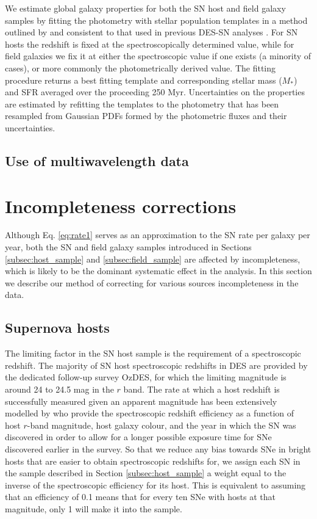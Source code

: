 \documentclass[fleqn,usenatbib]{mnras}
\begin{document}
We estimate global galaxy properties for both the SN host and field galaxy samples by fitting the photometry with stellar population templates in a method outlined by \citet{Sullivan2006} and consistent to that used in previous DES-SN analyses \citep{Kelsey2020,Smith2020,Wiseman2020}. For SN hosts the redshift is fixed at the spectroscopically determined value, while for field galaxies we fix it at either the spectroscopic value if one exists (a minority of cases), or more commonly the photometrically derived value. The fitting procedure returns a best fitting template and corresponding stellar mass ($M_*$) and SFR averaged over the proceeding 250 Myr. Uncertainties on the properties are estimated by refitting the templates to the photometry that has been resampled from Gaussian PDFs formed by the photometric fluxes and their uncertainties. 


\subsection{Use of multiwavelength data \label{subsec: fits_ugrizJHK}}

\section{Incompleteness corrections \label{sec:incompleteness}}

Although Eq. \ref{eq:rate1} serves as an approximation to the SN rate per galaxy per year, both the SN and field galaxy samples introduced in Sections \ref{subsec:host_sample} and \ref{subsec:field_sample} are affected by incompleteness, which is likely to be the dominant systematic effect in the analysis. In this section we describe our method of correcting for various sources incompleteness in the data.

\subsection{Supernova hosts \label{subsec:incompletenss_SNe}}
The limiting factor in the SN host sample is the requirement of a spectroscopic redshift. The majority of SN host spectroscopic redshifts in DES are provided by the dedicated follow-up survey OzDES, for which the limiting magnitude is around 24 to 24.5 mag in the $r$ band. The rate at which a host redshift is successfully measured given an apparent magnitude has been extensively modelled by  who provide the spectroscopic redshift efficiency as a function of host $r$-band magnitude, host galaxy colour, and the year in which the SN was discovered in order to allow for a longer possible exposure time for SNe discovered earlier in the survey. So that we reduce any bias towards SNe in bright hosts that are easier to obtain spectroscopic redshifts for, we assign each SN in the sample described in Section \ref{subsec:host_sample} a weight equal to the inverse of the spectroscopic efficiency for its host. This is equivalent to assuming that an efficiency of 0.1 means that for every ten SNe with hosts at that magnitude, only 1 will make it into the sample.
\end{document}
